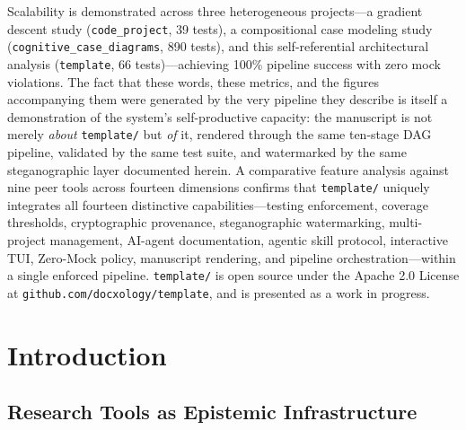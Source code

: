 \documentclass[
]{article}
\begin{document}
Scalability is demonstrated across three heterogeneous projects---a
gradient descent study (\texttt{code\_project}, 39 tests), a
compositional case modeling study (\texttt{cognitive\_case\_diagrams},
890 tests), and this self-referential architectural analysis
(\texttt{template}, 66 tests)---achieving 100\% pipeline success with
zero mock violations. The fact that these words, these metrics, and the
figures accompanying them were generated by the very pipeline they
describe is itself a demonstration of the system's self-productive
capacity: the manuscript is not merely \emph{about} \texttt{template/}
but \emph{of} it, rendered through the same ten-stage DAG pipeline,
validated by the same test suite, and watermarked by the same
steganographic layer documented herein. A comparative feature analysis
against nine peer tools across fourteen dimensions confirms that
\texttt{template/} uniquely integrates all fourteen distinctive
capabilities---testing enforcement, coverage thresholds, cryptographic
provenance, steganographic watermarking, multi-project management,
AI-agent documentation, agentic skill protocol, interactive TUI,
Zero-Mock policy, manuscript rendering, and pipeline
orchestration---within a single enforced pipeline. \texttt{template/} is
open source under the Apache 2.0 License at
\texttt{github.com/docxology/template}, and is presented as a work in
progress.

\newpage

\section{Introduction}\label{introduction}

\subsection{Research Tools as Epistemic
Infrastructure}\label{research-tools-as-epistemic-infrastructure}
\end{document}
